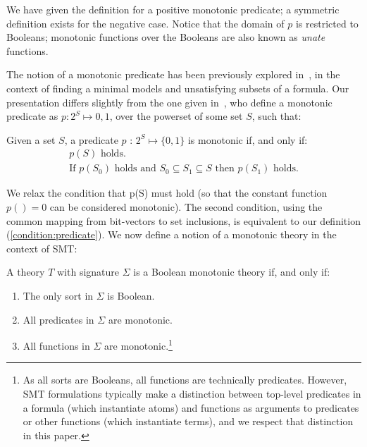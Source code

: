 \documentclass[runningheads]{llncs}
\begin{document}
We have given the definition for a positive monotonic predicate; a symmetric definition exists for the negative case. Notice that the domain of $p$ is restricted to Booleans; monotonic functions over the Booleans are also known as \textit{unate} functions. 

The notion of a monotonic predicate has been previously explored in~\cite{bradley2007checking,bradley2008property,marques2013minimal}, in the context of finding a minimal models and unsatisfying subsets of a formula. Our presentation differs slightly from the one given in~\cite{bradley2007checking,bradley2008property,marques2013minimal}, who define a monotonic predicate as $p: 2^S \mapsto {0,1}$, over the powerset of some set $S$, such that: 

\begin{definition}
Given a set $S$, a predicate $p$ : $2^S \mapsto \{0,1\}$ is monotonic if, and only if:
\begin{eqnarray}
p(S) \text{ holds.}\\
\text{If } p(S_0) \text{ holds and } S_0 \subseteq S_1 \subseteq S \text{ then } p(S_1) \text{ holds.}
\end{eqnarray}
\end{definition}

We relax the condition that p(S) must hold (so that the constant function $p() = 0$ can be considered monotonic). The second condition, using the common mapping from bit-vectors to set inclusions, is equivalent to our definition (\ref{condition:predicate}). We now define a notion of a monotonic theory in the context of SMT:

\begin{definition}
A theory $T$ with signature $\Sigma$ is a Boolean monotonic theory if, and only if:
\begin{enumerate}
\item\label{condition:boolean}   The only sort in $\Sigma$ is Boolean.
\item\label{condition:mono}   All predicates  in $\Sigma$ are monotonic.   
\item\label{condition:function}   All functions in $\Sigma$ are monotonic.\footnote{As all sorts are Booleans, all functions are technically predicates. However, SMT formulations typically make a distinction between top-level predicates in a formula (which instantiate atoms) and functions as arguments to predicates or other functions (which instantiate terms), and we respect that distinction in this paper.}  
\end{enumerate}
\end{definition}
\end{document}
